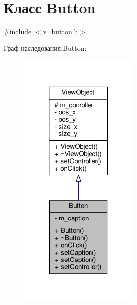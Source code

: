 \hypertarget{class_button}{\section{Класс Button}
\label{class_button}
}


{\ttfamily \#include $<$v\-\_\-button.\-h$>$}



Граф наследования\-:Button\-:
\nopagebreak
\begin{figure}[H]
\begin{center}
\leavevmode
\includegraphics[width=166pt]{class_button__inherit__graph}
\end{center}
\end{figure}


